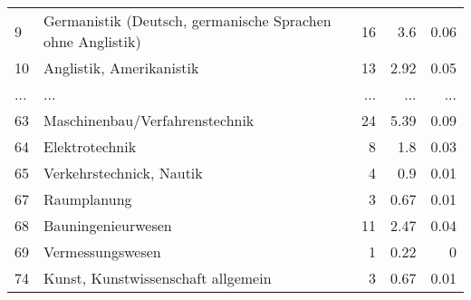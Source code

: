 \begin{longtable}{lXrrr}
        9 & \multicolumn{1}{X}{Germanistik (Deutsch, germanische Sprachen ohne Anglistik)} & %
          \num{16} &
          \num[round-mode=places,round-precision=2]{3.6} &
          \num[round-mode=places,round-precision=2]{0.06} \\
        10 & \multicolumn{1}{X}{Anglistik, Amerikanistik} & %
          \num{13} &
          \num[round-mode=places,round-precision=2]{2.92} &
          \num[round-mode=places,round-precision=2]{0.05} \\
       ... & ... & ... & ... & ... \\
        63 & \multicolumn{1}{X}{Maschinenbau/Verfahrenstechnik} & %
          \num{24} &
          \num[round-mode=places,round-precision=2]{5.39} &
          \num[round-mode=places,round-precision=2]{0.09} \\

        64 & \multicolumn{1}{X}{Elektrotechnik} & %
          \num{8} &
          \num[round-mode=places,round-precision=2]{1.8} &
          \num[round-mode=places,round-precision=2]{0.03} \\

        65 & \multicolumn{1}{X}{Verkehrstechnick, Nautik} & %
          \num{4} &
          \num[round-mode=places,round-precision=2]{0.9} &
          \num[round-mode=places,round-precision=2]{0.01} \\

        67 & \multicolumn{1}{X}{Raumplanung} & %
          \num{3} &
          \num[round-mode=places,round-precision=2]{0.67} &
          \num[round-mode=places,round-precision=2]{0.01} \\

        68 & \multicolumn{1}{X}{Bauningenieurwesen} & %
          \num{11} &
          \num[round-mode=places,round-precision=2]{2.47} &
          \num[round-mode=places,round-precision=2]{0.04} \\

        69 & \multicolumn{1}{X}{Vermessungswesen} & %
          \num{1} &
          \num[round-mode=places,round-precision=2]{0.22} &
          \num[round-mode=places,round-precision=2]{0} \\

        74 & \multicolumn{1}{X}{Kunst, Kunstwissenschaft allgemein} & %
          \num{3} &
          \num[round-mode=places,round-precision=2]{0.67} &
          \num[round-mode=places,round-precision=2]{0.01} \\


\end{longtable}

